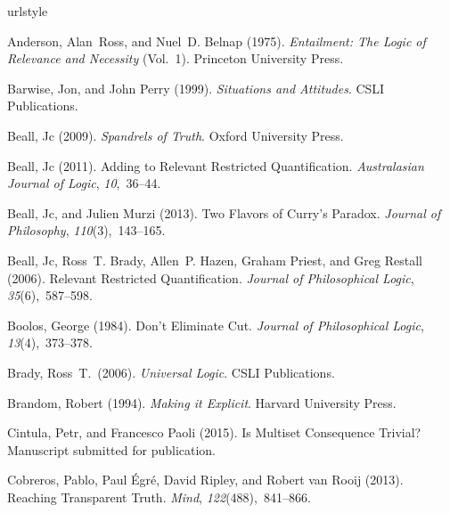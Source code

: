 \documentclass{ergoclass}
\begin{document}
\begin{thebibliography}{54}
\providecommand{\natexlab}[1]{#1}
\providecommand{\url}[1]{\texttt{#1}}
\expandafter\ifx\csname urlstyle\endcsname\relax
  \providecommand{\doi}[1]{doi: #1}\else
  \providecommand{\doi}{doi: \begingroup \urlstyle{rm}\Url}\fi

Anderson, Alan~Ross, and Nuel~D. Belnap (1975).
\newblock \emph{Entailment: The Logic of Relevance and Necessity} (Vol.~1).
\newblock Princeton University Press.

Barwise, Jon, and John Perry (1999).
\newblock \emph{Situations and Attitudes}.
\newblock CSLI Publications.

Beall, Jc (2009).
\newblock \emph{Spandrels of Truth}.
\newblock Oxford University Press.

Beall, Jc (2011).
\newblock Adding to Relevant Restricted Quantification.
\newblock \emph{Australasian Journal of Logic}, \emph{10},~36--44.

Beall, Jc, and Julien Murzi (2013).
\newblock Two Flavors of {C}urry's Paradox.
\newblock \emph{Journal of Philosophy}, \emph{110}(3),~143--165.

Beall, Jc, Ross~T. Brady, Allen~P. Hazen, Graham Priest, and Greg Restall
  (2006).
\newblock Relevant Restricted Quantification.
\newblock \emph{Journal of Philosophical Logic}, \emph{35}(6),~587--598.

Boolos, George (1984).
\newblock Don't Eliminate Cut.
\newblock \emph{Journal of Philosophical Logic}, \emph{13}(4),~373--378.

Brady, Ross~T.\ (2006).
\newblock \emph{Universal Logic}.
\newblock CSLI Publications.

Brandom, Robert (1994).
\newblock \emph{Making it Explicit}.
\newblock Harvard University Press.

Cintula, Petr, and Francesco Paoli (2015).
\newblock Is Multiset Consequence Trivial?
\newblock Manuscript submitted for publication.

Cobreros, Pablo, Paul {\'{E}}gr{\'{e}}, David Ripley, and Robert van Rooij
  (2013).
\newblock Reaching Transparent Truth.
\newblock \emph{Mind}, \emph{122}(488),~841--866.


\end{thebibliography}
\end{document}
